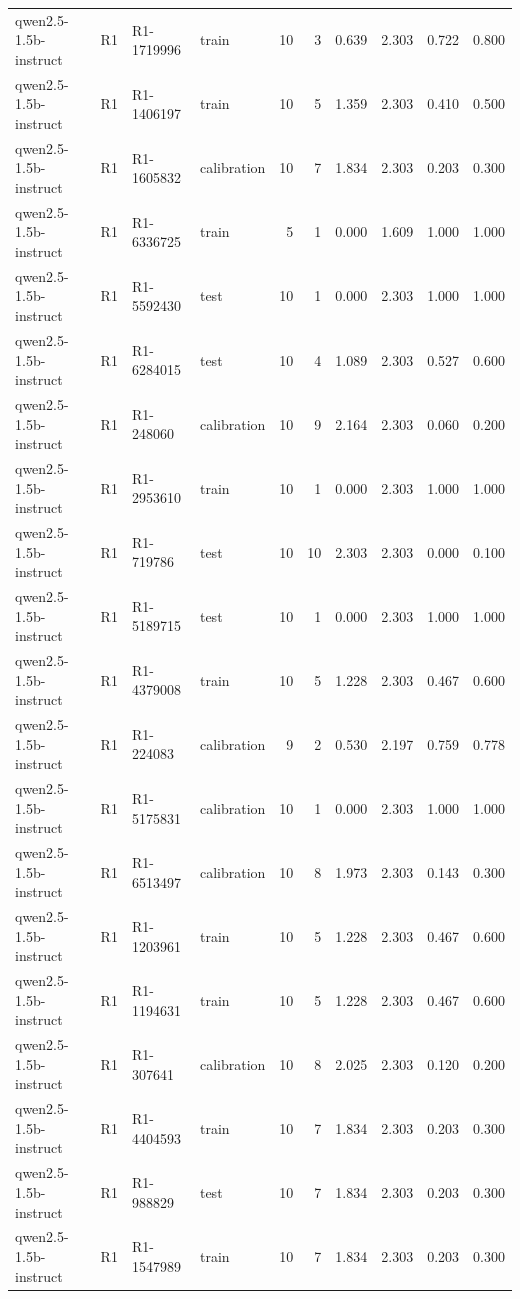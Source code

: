 \begin{table}
\begin{tabular}{llllrrrrrr}
qwen2.5-1.5b-instruct & R1 & R1-1719996 & train & 10 & 3 & 0.639 & 2.303 & 0.722 & 0.800 \\
qwen2.5-1.5b-instruct & R1 & R1-1406197 & train & 10 & 5 & 1.359 & 2.303 & 0.410 & 0.500 \\
qwen2.5-1.5b-instruct & R1 & R1-1605832 & calibration & 10 & 7 & 1.834 & 2.303 & 0.203 & 0.300 \\
qwen2.5-1.5b-instruct & R1 & R1-6336725 & train & 5 & 1 & 0.000 & 1.609 & 1.000 & 1.000 \\
qwen2.5-1.5b-instruct & R1 & R1-5592430 & test & 10 & 1 & 0.000 & 2.303 & 1.000 & 1.000 \\
qwen2.5-1.5b-instruct & R1 & R1-6284015 & test & 10 & 4 & 1.089 & 2.303 & 0.527 & 0.600 \\
qwen2.5-1.5b-instruct & R1 & R1-248060 & calibration & 10 & 9 & 2.164 & 2.303 & 0.060 & 0.200 \\
qwen2.5-1.5b-instruct & R1 & R1-2953610 & train & 10 & 1 & 0.000 & 2.303 & 1.000 & 1.000 \\
qwen2.5-1.5b-instruct & R1 & R1-719786 & test & 10 & 10 & 2.303 & 2.303 & 0.000 & 0.100 \\
qwen2.5-1.5b-instruct & R1 & R1-5189715 & test & 10 & 1 & 0.000 & 2.303 & 1.000 & 1.000 \\
qwen2.5-1.5b-instruct & R1 & R1-4379008 & train & 10 & 5 & 1.228 & 2.303 & 0.467 & 0.600 \\
qwen2.5-1.5b-instruct & R1 & R1-224083 & calibration & 9 & 2 & 0.530 & 2.197 & 0.759 & 0.778 \\
qwen2.5-1.5b-instruct & R1 & R1-5175831 & calibration & 10 & 1 & 0.000 & 2.303 & 1.000 & 1.000 \\
qwen2.5-1.5b-instruct & R1 & R1-6513497 & calibration & 10 & 8 & 1.973 & 2.303 & 0.143 & 0.300 \\
qwen2.5-1.5b-instruct & R1 & R1-1203961 & train & 10 & 5 & 1.228 & 2.303 & 0.467 & 0.600 \\
qwen2.5-1.5b-instruct & R1 & R1-1194631 & train & 10 & 5 & 1.228 & 2.303 & 0.467 & 0.600 \\
qwen2.5-1.5b-instruct & R1 & R1-307641 & calibration & 10 & 8 & 2.025 & 2.303 & 0.120 & 0.200 \\
qwen2.5-1.5b-instruct & R1 & R1-4404593 & train & 10 & 7 & 1.834 & 2.303 & 0.203 & 0.300 \\
qwen2.5-1.5b-instruct & R1 & R1-988829 & test & 10 & 7 & 1.834 & 2.303 & 0.203 & 0.300 \\
qwen2.5-1.5b-instruct & R1 & R1-1547989 & train & 10 & 7 & 1.834 & 2.303 & 0.203 & 0.300 \\

\end{tabular}
\end{table}
